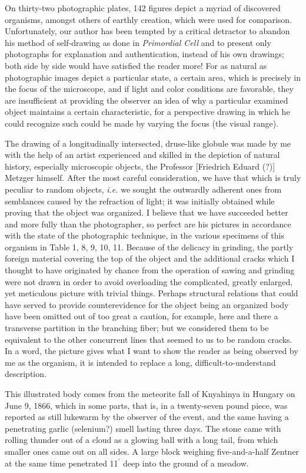 \documentclass[a4paper, 12pt, oneside]{article}
\begin{document}
On thirty-two photographic plates, 142 figures depict a myriad of discovered organisms, amongst others of earthly creation, which were used for comparison. Unfortunately, our author has been tempted by a critical detractor to abandon his method of self-drawing as done in \emph{Primordial Cell} and to present only photographs for explanation and authentication, instead of his own drawings; both side by side would have satisfied the reader more! For as natural as photographic images depict a particular state, a certain area, which is precisely in the focus of the microscope, and if light and color conditions are favorable, they are insufficient at providing the observer an idea of why a particular examined object maintains a certain characteristic, for a perspective drawing in which he could recognize such could be made by varying the focus (the visual range).

The drawing of a longitudinally intersected, druse-like globule was made by me with the help of an artist experienced and skilled in the depiction of natural history, especially microscopic objects, the Professor [Friedrich Eduard (?)] Metzger himself. After the most careful consideration, we have that which is truly peculiar to random objects, \emph{i.e.} we sought the outwardly adherent ones from semblances caused by the refraction of light; it was initially obtained while proving that the object was organized. I believe that we have succeeded better and more fully than the photographer, so perfect are his pictures in accordance with the state of the photographic technique, in the various specimens of this organism in Table 1, 8, 9, 10, 11. Because of the delicacy in grinding, the partly foreign material covering the top of the object and the additional cracks which I thought to have originated by chance from the operation of sawing and grinding were not drawn in order to avoid overloading the complicated, greatly enlarged, yet meticulous picture with trivial things. Perhaps structural relations that could have served to provide counterevidence for the object being an organized body have been omitted out of too great a caution, for example, here and there a transverse partition in the branching fiber; but we considered them to be equivalent to the other concurrent lines that seemed to us to be random cracks. In a word, the picture gives what I want to show the reader as being observed by me as the organism, it is intended to replace a long, difficult-to-understand description.

This illustrated body comes from the meteorite fall of Knyahinya in Hungary on June 9, 1866, which in some parts, that is, in a twenty-seven pound piece, was reported as still lukewarm by the observer of the event, and the same having a penetrating garlic (selenium?) smell lasting three days. The stone came with rolling thunder out of a cloud as a glowing ball with a long tail, from which smaller ones came out on all sides. A large block weighing five-and-a-half Zentner at the same time penetrated 11$^\prime$ deep into the ground of a meadow.
\end{document}
